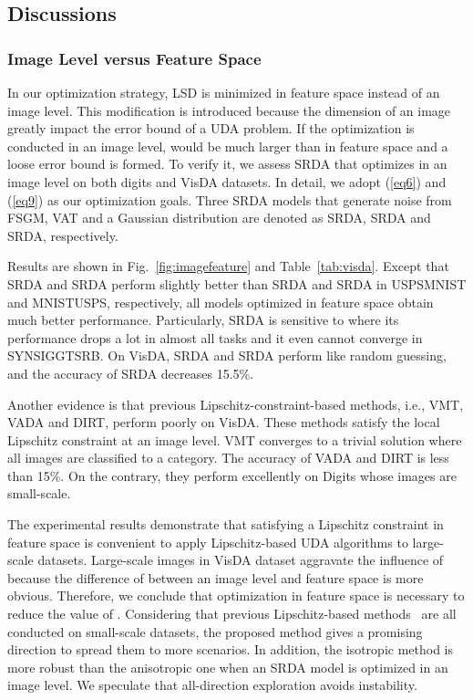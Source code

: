 \documentclass[journal,twocolumn]{IEEEtran}
\theoremstyle{definition}
\begin{document}
\subsection{Discussions}

\subsubsection{Image Level versus Feature Space}

In our optimization strategy, LSD is minimized in feature space instead of an image level. This modification is introduced  because the dimension  of an image greatly impact the error bound of a UDA problem. If the optimization is conducted in an image level,  would be much larger than in feature space and a loose error bound is formed. To verify it, we assess SRDA that optimizes in an image level on both digits and VisDA datasets. In detail, we adopt (\ref{eq6}) and (\ref{eq9}) as our optimization goals. Three SRDA models that generate noise from FSGM, VAT and a Gaussian distribution are denoted as SRDA, SRDA and SRDA, respectively. 

Results are shown in Fig.~\ref{fig:imagefeature} and Table~\ref{tab:visda}. Except that SRDA and SRDA perform slightly better than SRDA and SRDA in USPSMNIST and MNISTUSPS, respectively, all models optimized in feature space obtain much better performance. Particularly, SRDA is sensitive to  where its performance drops a lot in almost all tasks and it even cannot converge in SYNSIGGTSRB. On VisDA, SRDA and SRDA perform like random guessing, and the accuracy of SRDA decreases 15.5\%. 

Another evidence is that previous Lipschitz-constraint-based methods, i.e., VMT, VADA and DIRT, perform poorly on VisDA. These methods satisfy the local Lipschitz constraint at an image level. VMT converges to a trivial solution where all images are classified to a category. The accuracy of VADA and DIRT is less than 15\%. On the contrary, they perform excellently on Digits whose images are small-scale.

The experimental results demonstrate that satisfying a Lipschitz constraint in feature space is convenient to apply Lipschitz-based UDA algorithms to large-scale datasets. Large-scale images in VisDA dataset aggravate the influence of  because the difference of  between an image level and feature space is more obvious. Therefore, we conclude that optimization in feature space is necessary to reduce the value of . Considering that previous Lipschitz-based methods~\cite{shu2018a,mao2019virtual} are all conducted on small-scale datasets, the proposed method gives a promising direction to spread them to more scenarios. In addition, the isotropic method is more robust than the anisotropic one when an SRDA model is optimized in an image level. We speculate that all-direction exploration avoids instability.
\end{document}
